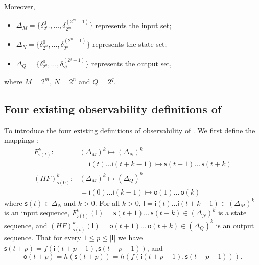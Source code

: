 %  
Moreover, 
   \begin{itemize}
 \item $\Delta_M = \{\delta^0_{2^m},\ldots,\delta^{({2^m}-1)}_{2^m} \}$ represents the input set; 
 \item $\Delta_N = \{\delta^0_{2^n},\ldots,\delta^{({2^n}-1)}_{2^n} \}$ represents the state set; 
 \item $\Delta_Q = \{\delta^0_{2^q},\ldots,\delta^{({2^q}-1)}_{2^q} \}$ represents the output set,
\end{itemize}
where $M=2^m$, $N=2^n$ and $Q=2^q$.

\subsection{Four existing observability definitions of \BCNs}
To introduce the four existing definitions of observability of \BCNs. 
We first define the mappings \cite{Zhang2016Observability}:
\begin{equation}
\begin{split}
F^k_{\mathsf{s}(t)}:& (\Delta_M)^k\mapsto(\Delta_N)^k\\
&=\mathsf{i}(t)\ldots \mathsf{i}({t+k-1}) \mapsto \mathsf{s}(t+1) \ldots\, \mathsf{s}(t+k)\\
(HF)^k_{\mathsf{s}(0)} :& (\Delta_M)^k\mapsto(\Delta_Q)^k\\
 &=\mathsf{i}(0)\ldots \mathsf{i}(k-1) \mapsto \mathsf{o}(1)\ldots\, \mathsf{o}(k)
\end{split}
\label{equ:6}
\end{equation}
where $\mathsf{s}(t)\in \Delta_N$ and $k>0$. For all  $k>0$,
$\mathsf{I}=\mathsf{i}(t)\ldots \mathsf{i}({t+k-1}) \in(\Delta_M)^k$
is an input sequence, 
$F^k_{\mathsf{s}(t)}(\mathsf{I})=\mathsf{s}(t+1) \ldots\, \mathsf{s}(t+k) \in(\Delta_N)^k$
 is a state sequence, and 
 $(HF)^k_{\mathsf{s}(t)}(\mathsf{I})=\mathsf{o}(t+1)\ldots\, \mathsf{o}(t+k) \in(\Delta_Q)^k$
 is an output sequence. That for every $1\le p \le |\mathsf{I}|$ we have 
 $\mathsf{s}(t+p)=f(\mathsf{i}(t+p-1),\mathsf{s}(t+p-1))$,
and 
 \[\mathsf{o}(t+p)=h(\mathsf{s}(t+p))=h(f(\mathsf{i}(t+p-1),\mathsf{s}(t+p-1))).\] 

